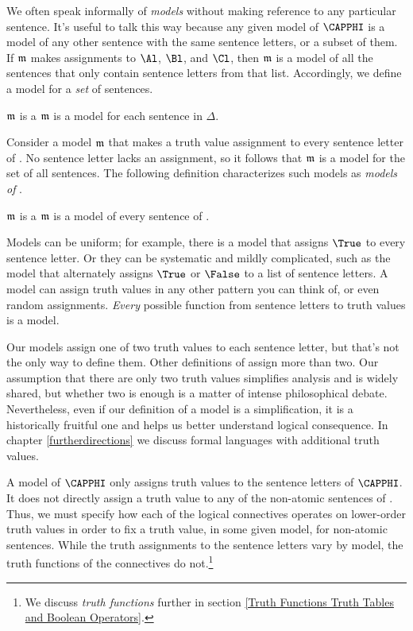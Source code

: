 We often speak informally of \emph{models} without making reference to any particular \GSL{} sentence.  It's useful to talk this way because any given model of $\CAPPHI$ is a model of any other \GSL{} sentence with the same sentence letters, or a subset of them.  If $\mathfrak{m}$ makes assignments to $\Al$, $\Bl$, and $\Cl$, then $\mathfrak{m}$ is a model of all the sentences that only contain sentence letters from that list.  Accordingly, we define a model for a \emph{set} of \GSL{} sentences.

\begin{majorILnc}{}
	$\mathfrak{m}$ is a  \Iff $\mathfrak{m}$ is a model for each sentence in $\Delta$.
\end{majorILnc}

Consider a model $\mathfrak{m}$ that makes a truth value assignment to every sentence letter of \GSL{}.  No sentence letter lacks an assignment, so it follows that $\mathfrak{m}$ is a model for the set of all \GSL{} sentences.  The following definition characterizes such models as \emph{models of \GSL{}}.

\begin{majorILnc}{}
	$\mathfrak{m}$ is a  \Iff $\mathfrak{m}$ is a model of every sentence of \GSL{}.
\end{majorILnc}

Models can be uniform; for example, there is a model that assigns $\True$ to every sentence letter.  Or they can be systematic and mildly complicated, such as the model that alternately assigns $\True$ or $\False$ to a list of sentence letters.
A model can assign truth values in any other pattern you can think of, or even random assignments. 
\emph{Every} possible function from sentence letters to truth values is a model.

Our models assign one of two truth values to each sentence letter, but that's not the only way to define them. Other definitions of  assign more than two.  Our assumption that there are only two truth values simplifies analysis and is widely shared, but whether two is enough is a matter of intense philosophical debate.  Nevertheless, even if our definition of a model is a simplification, it is a historically fruitful one and helps us better understand logical consequence.  In chapter \ref{furtherdirections} we discuss formal languages with additional truth values. 

A model of $\CAPPHI$ only assigns truth values to the sentence letters of $\CAPPHI$. It does not directly assign a truth value to any of the non-atomic sentences of \GSL{}. Thus, we must specify how each of the logical connectives operates on lower-order truth values in order to fix a truth value, in some given model, for non-atomic \GSL{} sentences.  While the truth assignments to the sentence letters vary by model, the truth functions of the connectives do not.\footnote{We discuss \emph{truth functions} further in section \ref{Truth Functions Truth Tables and Boolean Operators}.}

